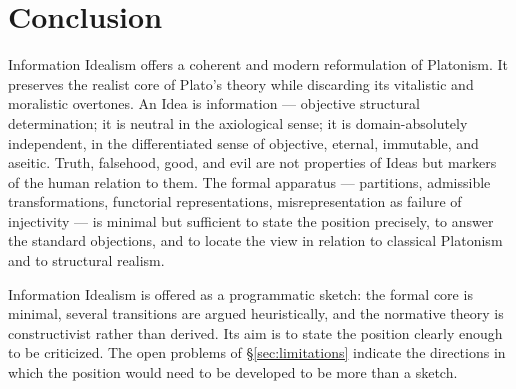 \documentclass[11pt,a4paper]{article}
\theoremstyle{definition}
\theoremstyle{remark}
\begin{document}
\section{Conclusion}

Information Idealism offers a coherent and modern reformulation of
Platonism. It preserves the realist core of Plato's theory while
discarding its vitalistic and moralistic overtones. An Idea is
information --- objective structural determination; it is neutral in
the axiological sense; it is domain-absolutely independent, in the
differentiated sense of objective, eternal, immutable, and aseitic.
Truth, falsehood, good, and evil are not properties of Ideas but
markers of the human relation to them. The formal apparatus ---
partitions, admissible transformations, functorial representations,
misrepresentation as failure of injectivity --- is minimal but
sufficient to state the position precisely, to answer the standard
objections, and to locate the view in relation to classical Platonism
and to structural realism.

Information Idealism is offered as a programmatic sketch: the formal
core is minimal, several transitions are argued heuristically, and the
normative theory is constructivist rather than derived. Its aim is to
state the position clearly enough to be criticized. The open problems
of \S\ref{sec:limitations} indicate the directions in which the
position would need to be developed to be more than a sketch.
\end{document}
